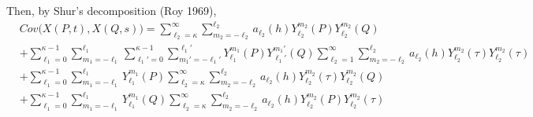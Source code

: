 \documentclass[11pt]{article}
\begin{document}
\begin{itemize}
Then, by Shur's decomposition (Roy 1969),\\
\begin{align*}
&Cov\biggl(X(P,t), X(Q,s)\biggl) = \sum_{\ell_2=\kappa}^{\infty} \sum_{m_2=-\ell_2}^{\ell_2} a_{\ell_2}(h) Y_{\ell_2}^{m_2}(P) Y_{\ell_2}^{m_2}(Q)\\ 
&+ \sum_{\ell_1=0}^{\kappa-1} \sum_{m_1=-\ell_1}^{\ell_1} \sum_{\ell_1'=0}^{\kappa-1} \sum_{m_1'=-\ell_1'}^{\ell_1'} Y_{\ell_1}^{m_1}(P) Y_{\ell_1'}^{m_1'}(Q) \sum_{\ell_2=1}^{\infty} \sum_{m_2=-\ell_2}^{\ell_2} a_{\ell_2}(h) Y_{\ell_2}^{m_2}(\tau) Y_{\ell_2}^{m_2}(\tau)\\
&+ \sum_{\ell_1=0}^{\kappa-1} \sum_{m_1=-\ell_1}^{\ell_1} Y_{\ell_1}^{m_1}(P) \sum_{\ell_2=\kappa}^{\infty} \sum_{m_2=-\ell_2}^{\ell_2}  a_{\ell_2}(h) Y_{\ell_2}^{m_2}(\tau) Y_{\ell_2}^{m_2}(Q)\\ 
&+ \sum_{\ell_1=0}^{\kappa-1} \sum_{m_1=-\ell_1}^{\ell_1} Y_{\ell_1}^{m_1}(Q) \sum_{\ell_2=\kappa}^{\infty} \sum_{m_2=-\ell_2}^{\ell_2}  a_{\ell_2}(h) Y_{\ell_2}^{m_2}(P) Y_{\ell_2}^{m_2}(\tau)\\
\end{align*}


\end{itemize}
\end{document}
